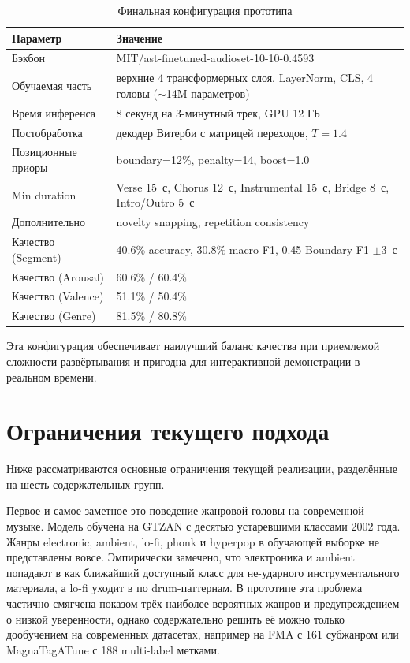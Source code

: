 \begin{table}[H]
\centering
\caption{Финальная конфигурация прототипа}
\label{tab:final-config}
\begin{tabular}{L{4cm}L{10cm}}
\toprule
Параметр & Значение \\
\midrule
Бэкбон & MIT/ast-finetuned-audioset-10-10-0.4593 \\
Обучаемая часть & верхние 4 трансформерных слоя, LayerNorm, CLS, 4 головы ($\sim$14M параметров) \\
Время инференса & 8 секунд на 3-минутный трек, GPU 12 ГБ \\
Постобработка & декодер Витерби с матрицей переходов, $T = 1.4$ \\
Позиционные приоры & boundary=12\%, penalty=14, boost=1.0 \\
Min duration & Verse 15~с, Chorus 12~с, Instrumental 15~с, Bridge 8~с, Intro/Outro 5~с \\
Дополнительно & novelty snapping, repetition consistency \\
Качество (Segment) & 40.6\% accuracy, 30.8\% macro-F1, 0.45 Boundary F1 $\pm 3$~с \\
Качество (Arousal) & 60.6\% / 60.4\% \\
Качество (Valence) & 51.1\% / 50.4\% \\
Качество (Genre) & 81.5\% / 80.8\% \\
\bottomrule
\end{tabular}
\end{table}

Эта конфигурация обеспечивает наилучший баланс качества при приемлемой сложности развёртывания и пригодна для интерактивной демонстрации в реальном времени.

\section{Ограничения текущего подхода}\label{sec:7-3}

Ниже рассматриваются основные ограничения текущей реализации, разделённые на шесть содержательных групп.

Первое и самое заметное это поведение жанровой головы на современной музыке. Модель обучена на GTZAN с десятью устаревшими классами 2002 года. Жанры electronic, ambient, lo-fi, phonk и hyperpop в обучающей выборке не представлены вовсе. Эмпирически замечено, что электроника и ambient попадают в  как ближайший доступный класс для не-ударного инструментального материала, а lo-fi уходит в  по drum-паттернам. В прототипе эта проблема частично смягчена показом трёх наиболее вероятных жанров и предупреждением о низкой уверенности, однако содержательно решить её можно только дообучением на современных датасетах, например на FMA с 161 субжанром или MagnaTagATune с 188 multi-label метками.

